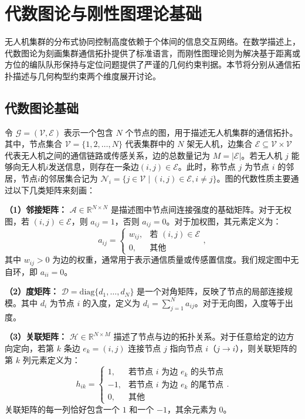\section{代数图论与刚性图理论基础}
\label{sec:graph_and_rigidity}

无人机集群的分布式协同控制高度依赖于个体间的信息交互网络。在数学描述上，代数图论为刻画集群通信拓扑提供了标准语言，而刚性图理论则为解决基于距离或方位的编队队形保持与定位问题提供了严谨的几何约束判据。本节将分别从通信拓扑描述与几何构型约束两个维度展开讨论。

\subsection{代数图论基础}
令 $\mathcal{G} = (\mathcal{V}, \mathcal{E})$ 表示一个包含 $N$ 个节点的图，用于描述无人机集群的通信拓扑。其中，节点集合 $\mathcal{V} = \{1, 2, \dots, N\}$ 代表集群中的 $N$ 架无人机，边集合 $\mathcal{E} \subseteq \mathcal{V} \times \mathcal{V}$ 代表无人机之间的通信链路或传感关系，边的总数量记为 $M = |\mathcal{E}|$。若无人机 $j$ 能够向无人机$i$发送信息，则存在一条边$(i, j) \in \mathcal{E}$。此时，称节点 $j$ 为节点 $i$ 的邻居，节点$i$的邻居集合记为 $\mathcal{N}_i = \{j \in \mathcal{V} \mid (i, j) \in \mathcal{E},i \neq j\}$。图的代数性质主要通过以下几类矩阵来刻画：

\textbf{（1）邻接矩阵：} $\mathcal{A} \in \mathbb{R}^{N \times N}$ 是描述图中节点间连接强度的基础矩阵。对于无权图，若 $(i, j) \in \mathcal{E}$，则 $a_{ij} = 1$，否则 $a_{ij} = 0$。对于加权图，其元素定义为：
\begin{equation}
	a_{ij} = 
	\begin{cases}
		w_{ij}, & \text{若 } (i, j) \in \mathcal{E} \\
		0, & \text{其他}
	\end{cases},
\end{equation}
其中 $w_{ij} > 0$ 为边的权重，通常用于表示通信质量或传感置信度。我们规定图中无自环，即 $a_{ii} = 0$。

\textbf{（2）度矩阵：} $\mathcal{D} = \text{diag}\{d_1, \dots, d_N\}$ 是一个对角矩阵，反映了节点的局部连接规模。其中 $d_i$ 为节点 $i$ 的入度，定义为 $d_i = \sum_{j=1}^{N} a_{ij}$。对于无向图，入度等于出度。

\textbf{（3）关联矩阵：} $\mathcal{H} \in \mathbb{R}^{N \times M}$ 描述了节点与边的拓扑关系。对于任意给定的边方向定向，若第 $k$ 条边 $e_k = (i, j)$ 连接节点 $j$ 指向节点 $i$（$j \to i$），则关联矩阵的第 $k$ 列元素定义为：
\begin{equation}
	h_{ik} = 
	\begin{cases}
		1, & \text{若节点 } i \text{ 为边 } e_k \text{ 的头节点} \\
		-1, & \text{若节点 } i \text{ 为边 } e_k \text{ 的尾节点} \\
		0, & \text{其他}
	\end{cases}.
\end{equation}
关联矩阵的每一列恰好包含一个 $1$ 和一个 $-1$，其余元素为 $0$。

